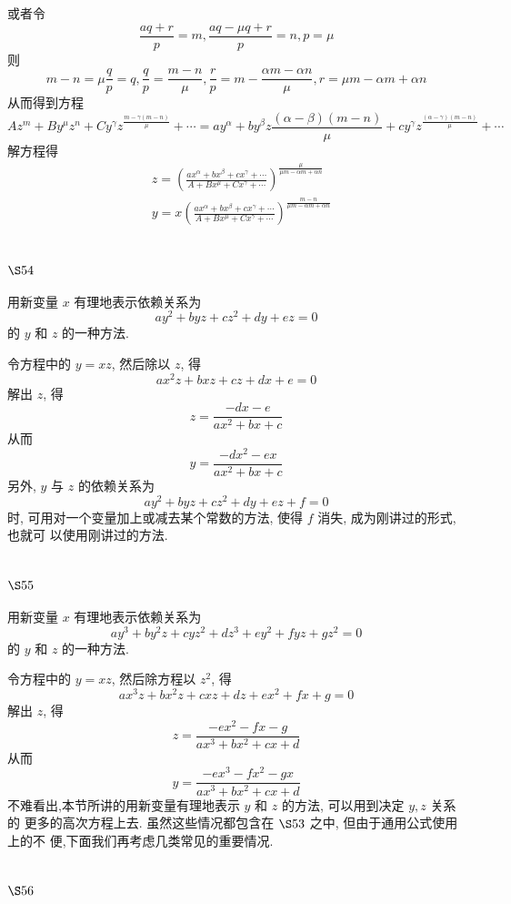 或者令
\[
\frac{a q+r}{p}=m, \frac{a q-\mu q+r}{p}=n, p=\mu
\]
则
\[
m-n=\mu \frac{q}{p}=q, \frac{q}{p}=\frac{m-n}{\mu}, \frac{r}{p}=m-\frac{\alpha m-\alpha n}{\mu}, r=\mu m-\alpha m+\alpha n
\]
从而得到方程
\[
A z^{m}+B y^{\mu} z^{n}+C y^{\gamma} z^{\frac{m-\gamma(m-n)}{\mu}}+\cdots=a y^{\alpha}+b y^{\beta} z \frac{(\alpha-\beta)(m-n)}{\mu}+c y^{\gamma} z^{\frac{(\alpha-\gamma)(m-n)}{\mu}}+\cdots
\]
解方程得
\[
\begin{aligned}
& z=\left(\frac{a x^{\alpha}+b x^{\beta}+c x^{\gamma}+\cdots}{A+B x^{\mu}+C x^{\gamma}+\cdots}\right)^{\frac{\mu}{\mu m-\alpha m+\alpha n}} \\
& y=x\left(\frac{a x^{\alpha}+b x^{\beta}+c x^{\gamma}+\cdots}{A+B x^{\mu}+C x^{\gamma}+\cdots}\right)^{\frac{m-n}{\mu m-\alpha m+\alpha n}}
\end{aligned}
\]
\section{$\S 54$}

用新变量 $x$ 有理地表示依赖关系为
\[
a y^{2}+b y z+c z^{2}+d y+e z=0
\]
的 $y$ 和 $z$ 的一种方法.

令方程中的 $y=x z$, 然后除以 $z$, 得
\[
a x^{2} z+b x z+c z+d x+e=0
\]
解出 $z$, 得
\[
z=\frac{-d x-e}{a x^{2}+b x+c}
\]
从而
\[
y=\frac{-d x^{2}-e x}{a x^{2}+b x+c}
\]
另外, $y$ 与 $z$ 的依赖关系为
\[
a y^{2}+b y z+c z^{2}+d y+e z+f=0
\]
时, 可用对一个变量加上或减去某个常数的方法, 使得 $f$ 消失, 成为刚讲过的形式, 也就可 以使用刚讲过的方法.

\section{$\S 55$}

用新变量 $x$ 有理地表示依赖关系为
\[
a y^{3}+b y^{2} z+c y z^{2}+d z^{3}+e y^{2}+f y z+g z^{2}=0
\]
的 $y$ 和 $z$ 的一种方法.

令方程中的 $y=x z$, 然后除方程以 $z^{2}$, 得
\[
a x^{3} z+b x^{2} z+c x z+d z+e x^{2}+f x+g=0
\]
解出 $z$, 得
\[
z=\frac{-e x^{2}-f x-g}{a x^{3}+b x^{2}+c x+d}
\]
从而
\[
y=\frac{-e x^{3}-f x^{2}-g x}{a x^{3}+b x^{2}+c x+d}
\]
不难看出,本节所讲的用新变量有理地表示 $y$ 和 $z$ 的方法, 可以用到决定 $y, z$ 关系的 更多的高次方程上去. 虽然这些情况都包含在 $\S 53$ 之中, 但由于通用公式使用上的不 便,下面我们再考虑几类常见的重要情况.

\section{$\S 56$}

